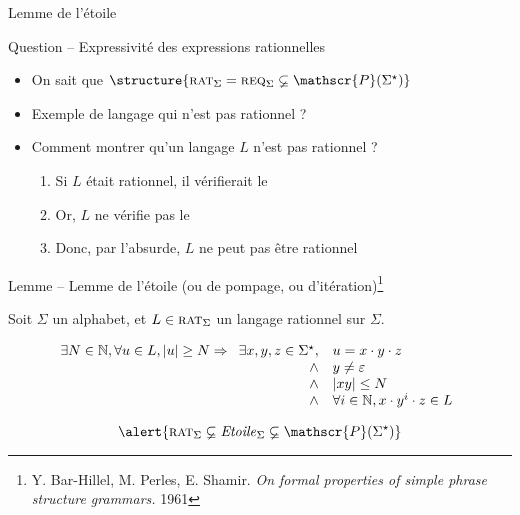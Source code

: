 
\begingroup

\begin{frame}{Lemme de l'étoile}

  \begin{block}{Question -- Expressivité des expressions rationnelles}
    \begin{itemize}
    \item On sait que $\structure{\textsc{rat}_\Sigma = \textsc{req}_\Sigma \varsubsetneq \mathscr{P}(\Sigma^\star)}$
    \item Exemple de langage qui n'est pas rationnel ? 
    \item Comment montrer qu'un langage $L$ n'est pas rationnel ? 
      \begin{enumerate}
      \item Si $L$ était rationnel, il vérifierait le  
      \item Or, $L$ ne vérifie pas le  
      \item Donc, par l'absurde, $L$ ne peut pas être rationnel
      \end{enumerate}
    \end{itemize}
  \end{block}

  \begin{alertblock}{Lemme -- Lemme de l'étoile (ou de pompage, ou d'itération)\footnote[frame, 1]{\scriptsize Y. Bar-Hillel, M. Perles, E. Shamir. \textit{On formal properties of simple phrase structure grammars.} 1961}}

    Soit $\Sigma$ un alphabet, et $L\in \textsc{rat}_\Sigma$ un langage rationnel sur $\Sigma$.

    $$
    \begin{array}{c}
      \exists N\in \mathbb{N}, \forall u\in L, |u| \ge N \Rightarrow
      \begin{array}[t]{rl}
        \exists x, y, z\in \Sigma^\star, &u = x\cdot y \cdot z \\
        \land& y\neq \varepsilon \\
        \land& |xy| \le N\\
        \land& \forall i \in \mathbb{N}, x\cdot y^i \cdot z \in L
      \end{array}
    \end{array}
    $$

    $$\alert{\textsc{rat}_\Sigma \varsubsetneq \mathit{Etoile}_\Sigma \varsubsetneq \mathscr{P}(\Sigma^\star)}$$
  \end{alertblock}
\end{frame}


\endgroup
